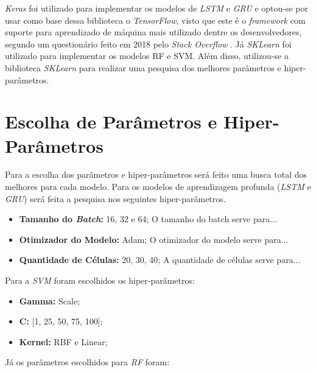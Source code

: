 \textit{Keras} foi utilizado para implementar os modelos de \textit{\acrshort{LSTM}} e \textit{\acrshort{GRU}} e optou-se por usar como base dessa biblioteca o \textit{TensorFlow}, visto que este é o \textit{framework} com suporte para aprendizado de máquina mais utilizado dentre os desenvolvedores, segundo um questionário feito em 2018 pelo \textit{Stack Overflow} \cite{stack_2018}. Já \textit{SKLearn} foi utilizado para implementar os modelos \acrshort{RF} e \acrshort{SVM}. Além disso, utilizou-se a biblioteca \textit {SKLearn} para realizar uma pesquisa dos melhores parâmetros e hiper-parâmetros.

\section{Escolha de Parâmetros e Hiper-Parâmetros}

Para a escolha dos parâmetros e hiper-parâmetros será feito uma busca total dos melhores para cada modelo. Para os modelos de aprendizagem profunda (\textit{\acrshort{LSTM}} e \textit{\acrshort{GRU}}) será feita a pesquisa nos seguintes hiper-parâmetros.


\begin{itemize}
    \item \textbf{Tamanho do \textit{Batch}:} 16, 32 e 64; \newline
    O tamanho do batch serve para...
    \item \textbf{Otimizador do Modelo:} Adam; \newline
    O otimizador do modelo serve para...
    \item \textbf{Quantidade de Células:} 20, 30, 40; \newline
    A quantidade de células serve para...
\end{itemize}

Para a \textit{\acrshort{SVM}} foram escolhidos os hiper-parâmetros:

\begin{itemize}
    \item \textbf{Gamma:} Scale;
    \item \textbf{C:} [1, 25, 50, 75, 100];
    \item \textbf{Kernel:} RBF e Linear;
\end{itemize}

Já os parâmetros escolhidos para \textit{\acrshort{RF}} foram:

